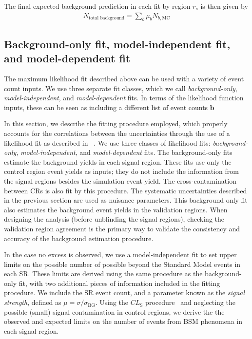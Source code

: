 The final expected background prediction in each fit by region $r_s$ is then given by
\begin{align}
N_{\text{total background}} = \sum_b \mu_b N_{b, \text{MC}}
\end{align}

\subsection{Background-only fit, model-independent fit, and model-dependent fit}

The maximum likelihood fit described above can be used with a variety of event count inputs.
We use three separate fit classes, which we call \textit{background-only}, \textit{model-independent}, and \textit{model-dependent} fits.
In terms of the likelihood function inputs, these can be seen as including a different list of event counts $\bm{b}$

In this section, we describe the fitting procedure employed, which properly accounts for the correlations between the uncertainties through the use of a likelihood fit as described in ~\cite{Baak:2014wma}.
We use three classes of likelihood fits: \textit{background-only}, \textit{model-independent}, and \textit{model-dependent} fits.
The background-only fits estimate the background yields in each signal region.
These fits use only the control region event yields as inputs; they do not include the information from the signal regions besides the simulation event yield.
The cross-contamination between CRs is also fit by this procedure.
The systematic uncertainties described in the previous section are used as nuisance parameters.
This background only fit also estimates the background event yields in the validation regions.
When designing the analysis (before unblinding the signal regions), checking the validation region agreement is the primary way to validate the consistency and accuracy of the background estimation procedure.

In the case no excess is observed, we use a model-independent fit to set upper limits on the possible number of possible beyond the Standard Model events in each SR.
These limits are derived using the same procedure as the background-only fit, with two additional pieces of information included in the fitting procedure.
We include the SR event count, and a parameter known as the \textit{signal strength}, defined as $\mu = \sigma/\sigma_{\mathrm{BG}}$.
Using the $CL_{\mathrm{S}}$ procedure~\cite{Feldman:1997qc} and neglecting the possible (small) signal contamination in control regions, we derive the the observed and expected limits on the number of events from BSM phenomena in each signal region.

